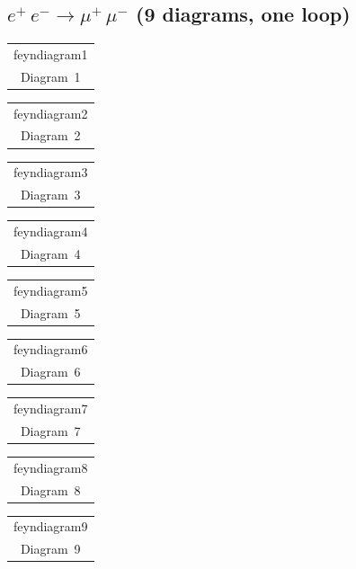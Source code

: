 \documentclass[a4paper,11pt]{article}
\makeatletter
\newcommand{\FeynDiagram}[1]{\csname feyndiagram#1\endcsname}
\newcommand{\FeynCell}[1]{\begin{tabular}[t]{@{}c@{}}\FeynDiagram{#1}\\[1ex]\small Diagram~#1\end{tabular}}
\makeatother
\begin{document}
\setlength{\parindent}{0pt}
\subsection*{$e^{+}\,e^{-} \to \mu^{+}\,\mu^{-}$ \normalfont(9 diagrams, one loop)}
\noindent \FeynCell{1}\hfill \FeynCell{2}\par\bigskip
\noindent \FeynCell{3}\hfill \FeynCell{4}\par\bigskip
\noindent \FeynCell{5}\hfill \FeynCell{6}\par\bigskip
\noindent \FeynCell{7}\hfill \FeynCell{8}\par\bigskip
\noindent \FeynCell{9}\par\bigskip
\end{document}
